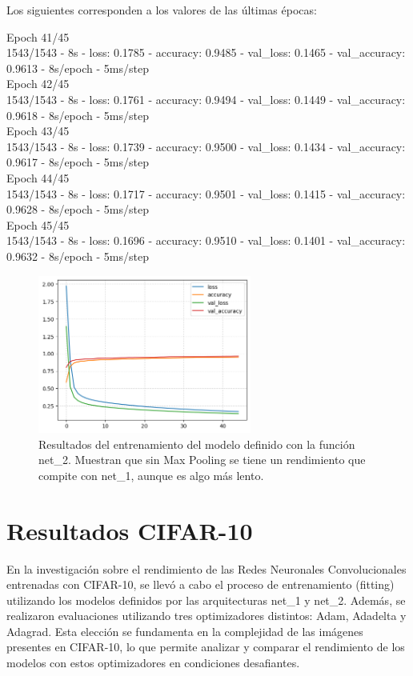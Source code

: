 \documentclass[journal]{IEEEtai}
\begin{document}
Los siguientes corresponden a los valores de las últimas épocas:

\hfill\break
Epoch 41/45\\
1543/1543 - 8s - loss: 0.1785 - accuracy: 0.9485 - val\_loss: 0.1465 - val\_accuracy: 0.9613 - 8s/epoch - 5ms/step\\
Epoch 42/45\\
1543/1543 - 8s - loss: 0.1761 - accuracy: 0.9494 - val\_loss: 0.1449 - val\_accuracy: 0.9618 - 8s/epoch - 5ms/step\\
Epoch 43/45\\
1543/1543 - 8s - loss: 0.1739 - accuracy: 0.9500 - val\_loss: 0.1434 - val\_accuracy: 0.9617 - 8s/epoch - 5ms/step\\
Epoch 44/45\\
1543/1543 - 8s - loss: 0.1717 - accuracy: 0.9501 - val\_loss: 0.1415 - val\_accuracy: 0.9628 - 8s/epoch - 5ms/step\\
Epoch 45/45\\
1543/1543 - 8s - loss: 0.1696 - accuracy: 0.9510 - val\_loss: 0.1401 - val\_accuracy: 0.9632 - 8s/epoch - 5ms/step\\

\begin{figure}[h!]
\centering
\includegraphics[width=7cm]{img/definiryentrenar2.png}
\caption{Resultados del entrenamiento del modelo definido con la función net\_2. Muestran que sin Max Pooling se tiene un rendimiento que compite con net\_1, aunque es algo más lento.}
\label{fig: definiryentrenar1}
\end{figure}

\section{Resultados CIFAR-10}

En la investigación sobre el rendimiento de las Redes Neuronales Convolucionales entrenadas con CIFAR-10, se llevó a cabo el proceso de entrenamiento (fitting) utilizando los modelos definidos por las arquitecturas net\_1 y net\_2. Además, se realizaron evaluaciones utilizando tres optimizadores distintos: Adam, Adadelta y Adagrad. Esta elección se fundamenta en la complejidad de las imágenes presentes en CIFAR-10, lo que permite analizar y comparar el rendimiento de los modelos con estos optimizadores en condiciones desafiantes.
\hfill\break
\end{document}
